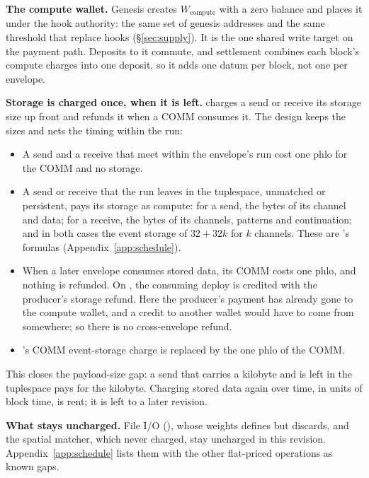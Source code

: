 \documentclass[11pt]{article}
\newcommand{\code}{\path}
\begin{document}
\textbf{The compute wallet.} Genesis creates $W_{\mathrm{compute}}$ with a zero balance and places it under the hook authority: the same set of genesis addresses and the same threshold that replace hooks (\S\ref{sec:supply}). It is the one shared write target on the payment path. Deposits to it commute, and settlement combines each block's compute charges into one deposit, so it adds one datum per block, not one per envelope.

\textbf{Storage is charged once, when it is left.} \code{dev} charges a send or receive its storage size up front and refunds it when a COMM consumes it. The design keeps the sizes and nets the timing within the run:
\begin{itemize}
\item A send and a receive that meet within the envelope's run cost one phlo for the COMM and no storage.
\item A send or receive that the run leaves in the tuplespace, unmatched or persistent, pays its storage as compute: for a send, the bytes of its channel and data; for a receive, the bytes of its channels, patterns and continuation; and in both cases the event storage of $32 + 32k$ for $k$ channels. These are \code{dev}'s formulas (Appendix~\ref{app:schedule}).
\item When a later envelope consumes stored data, its COMM costs one phlo, and nothing is refunded. On \code{dev}, the consuming deploy is credited with the producer's storage refund. Here the producer's payment has already gone to the compute wallet, and a credit to another wallet would have to come from somewhere; so there is no cross-envelope refund.
\item \code{dev}'s COMM event-storage charge is replaced by the one phlo of the COMM.
\end{itemize}
This closes the payload-size gap: a send that carries a kilobyte and is left in the tuplespace pays for the kilobyte. Charging stored data again over time, in units of block time, is rent; it is left to a later revision.

\textbf{What stays uncharged.} File I/O (\code{rho:io:fs:native:*}), whose weights \code{dev} defines but discards, and the spatial matcher, which \code{dev} never charged, stay uncharged in this revision. Appendix~\ref{app:schedule} lists them with the other flat-priced operations as known gaps.
\end{document}
